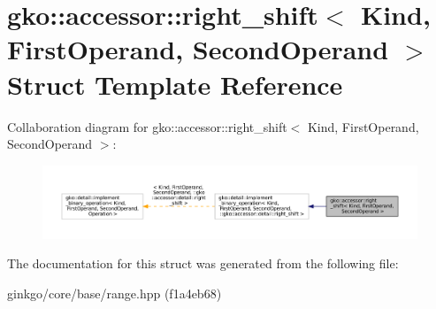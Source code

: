 \hypertarget{structgko_1_1accessor_1_1right__shift}{}\section{gko\+:\+:accessor\+:\+:right\+\_\+shift$<$ Kind, First\+Operand, Second\+Operand $>$ Struct Template Reference}
\label{structgko_1_1accessor_1_1right__shift}


Collaboration diagram for gko\+:\+:accessor\+:\+:right\+\_\+shift$<$ Kind, First\+Operand, Second\+Operand $>$\+:
\nopagebreak
\begin{figure}[H]
\begin{center}
\leavevmode
\includegraphics[width=350pt]{structgko_1_1accessor_1_1right__shift__coll__graph}
\end{center}
\end{figure}


The documentation for this struct was generated from the following file\+:\begin{DoxyCompactItemize}
\item 
ginkgo/core/base/range.\+hpp (f1a4eb68)\end{DoxyCompactItemize}
